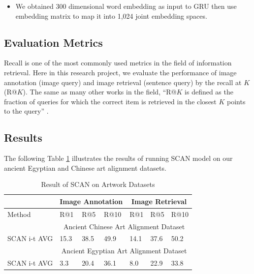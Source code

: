 \begin{itemize}
    \item We obtained 300 dimensional word embedding as input to GRU then use embedding matrix to map it into 1,024 joint embedding spaces.
\end{itemize}

\subsection{Evaluation Metrics}

Recall is one of the most commonly used metrics in the field of information retrieval. Here in this research project, we evaluate the performance of image annotation (image query) and image retrieval (sentence query) by the recall at $K$ (R@$K$). The same as many other works in the field, ``R@$K$ is defined as the fraction of queries for which the correct item is retrieved in the closest $K$ points to the query'' \cite{scan}. 

\subsection{Results}

The following Table \ref{table:resultscan} illustrates the results of running SCAN model on our ancient Egyptian and Chinese art alignment datasets.

\begin{table}[h!]
\centering
\begin{tabular}{lllllll}
\hline\hline
                       & \multicolumn{3}{c}{Image Annotation} & \multicolumn{3}{c}{Image Retrieval} \\ \hline
Method                 & R@1         & R@5         & R@10       & R@1        & R@5        & R@10      \\ \hline\hline
\multicolumn{1}{r}{}   & \multicolumn{6}{c}{Ancient Chinese Art Alignment Dataset}                   \\ \hline
SCAN i-t AVG & 15.3        & 38.5        & 49.9       & 14.1       & 37.6       & 50.2      \\ \hline\hline
\multicolumn{1}{r}{}   & \multicolumn{6}{c}{Ancient Egyptian Art Alignment Dataset}                    \\ \hline
SCAN i-t AVG & 3.3         & 20.4        & 36.1       & 8.0        & 22.9       & 33.8 \\\hline\hline     
\end{tabular}
\caption{Result of SCAN on Artwork Datasets}
\label{table:resultscan}
\end{table}

